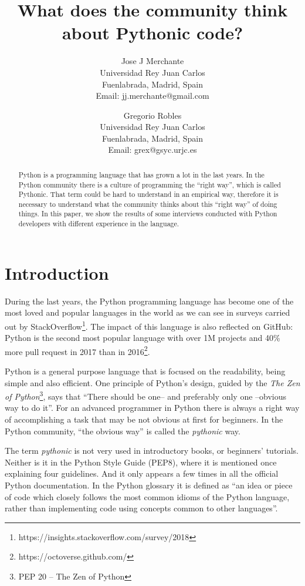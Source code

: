 \documentclass[a4paper]{article}
\title{What does the community think about Pythonic code?}
\author{
Jose J Merchante \\ 
Universidad Rey Juan Carlos\\
Fuenlabrada, Madrid, Spain\\
Email: jj.merchante@gmail.com
\and
Gregorio Robles \\
Universidad Rey Juan Carlos\\
Fuenlabrada, Madrid, Spain\\
Email: grex@gsyc.urjc.es
}
\begin{document}
\maketitle

\begin{abstract}
Python is a programming language that has grown a lot in the last years. In the Python community there is a culture of programming the ``right way'', which is called Pythonic. That term could be hard to understand in an empirical way, therefore it is necessary to understand what the community thinks about this ``right way'' of doing things. In this paper, we show the results of some interviews conducted with Python developers with different experience in the language.

\end{abstract}


\section{Introduction}

During the last years, the Python programming language has become one of the most loved and popular languages in the world as we can see in surveys carried out by StackOverflow\footnote{https://insights.stackoverflow.com/survey/2018}. The impact of this language is also reflected on GitHub: Python is the second most popular language with over 1M projects and 40\% more pull request in 2017 than in 2016\footnote{https://octoverse.github.com/}. 

Python is a general purpose language that is focused on the readability, being simple and also efficient. One principle of Python's design, guided by the \textit{The Zen of Python}\footnote{PEP 20 -- The Zen of Python}, says that ``There should be one-- and preferably only one --obvious way to do it''. For an advanced programmer in Python there is always a right way of accomplishing a task that may be not obvious at first for beginners. In the Python community, ``the obvious way'' is called the \emph{pythonic} way.

The term \textit{pythonic} is not very used in introductory books, or beginners' tutorials. Neither is it in the Python Style Guide (PEP8), where it is mentioned once explaining four guidelines.  And it only appears a few times in all the official Python documentation. In the Python glossary it is defined as ``an idea or piece of code which closely follows the most common idioms of the Python language, rather than implementing code using concepts common to other languages''.
\end{document}
